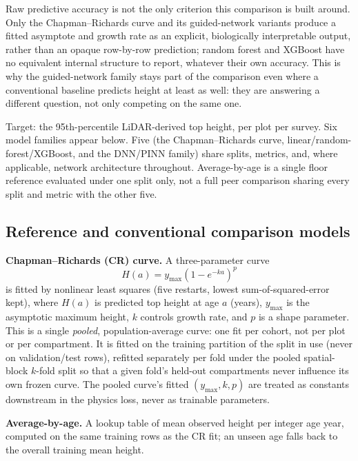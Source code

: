 \documentclass[11pt,a4paper]{report}
\begin{document}
Raw predictive accuracy is not the only criterion this comparison is built around. Only the
Chapman--Richards curve and its guided-network variants produce a fitted asymptote and growth rate
as an explicit, biologically interpretable output, rather than an opaque row-by-row prediction;
random forest and XGBoost have no equivalent internal structure to report, whatever their own
accuracy. This is why the guided-network family stays part of the comparison even where a
conventional baseline predicts height at least as well: they are answering a different question,
not only competing on the same one.

Target: the 95th-percentile LiDAR-derived top height, per plot per survey. Six model families
appear below. Five (the Chapman--Richards curve, linear/random-forest/XGBoost, and the DNN/PINN
family) share splits, metrics, and, where applicable, network architecture throughout.
Average-by-age is a single floor reference evaluated under one split only, not a full peer
comparison sharing every split and metric with the other five.

\subsection{Reference and conventional comparison models}

\textbf{Chapman--Richards (CR) curve.} A three-parameter curve
\begin{equation}
H(a) = y_{\max}\left(1-e^{-ka}\right)^{p}
\label{eq:cr}
\end{equation}
is fitted by nonlinear least squares (five restarts, lowest sum-of-squared-error kept), where
$H(a)$ is predicted top height at age $a$ (years), $y_{\max}$ is the asymptotic maximum height,
$k$ controls growth rate, and $p$ is a shape parameter. This is a single \emph{pooled},
population-average curve: one fit per cohort, not per plot or per compartment. It is fitted on the
training partition of the split in use (never on validation/test rows), refitted separately per
fold under the pooled spatial-block $k$-fold split so that a given fold's held-out compartments
never influence its own frozen curve. The pooled curve's fitted $(y_{\max},k,p)$ are treated as
constants downstream in the physics loss, never as trainable parameters.

\textbf{Average-by-age.} A lookup table of mean observed height per integer age year, computed on
the same training rows as the CR fit; an unseen age falls back to the overall training mean
height.
\end{document}
